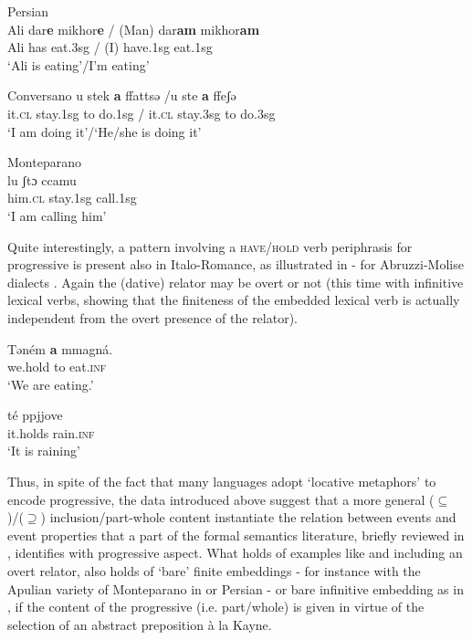\documentclass[output=paper,modfonts,nonflat,newtxmath,colorlinks,citecolor=brown]{langsci/langscibook}
\begin{document}
\ea Persian\\%
    \label{ex:franco:15}
    \gll Ali dar\textbf{e} mikhor\textbf{e} / (Man) dar\textbf{am} mikhor\textbf{am} \\
        Ali has eat.3sg / (I) have.1sg eat.1sg\\
    \glt ‘Ali is eating’/I’m eating’
    \z


\ea Conversano %
    \label{ex:franco:16}
    \gll u stek   \textbf{a}   ffattsə /u   ste   \textbf{a}  ffeʃə\\
        it.\textsc{cl}   stay.1sg to   do.1sg / it.\textsc{cl}   stay.3sg   to do.3sg\\
    \glt ‘I am doing it’/‘He/she is doing it’
    \z
    
\ea Monteparano\\ %
    \label{ex:franco:17}
    \gll lu   ʃtɔ   ccamu  \\
        him.\textsc{cl} stay.1sg   call.1sg \\
    \glt 
‘I am calling him’
    \z

   

Quite interestingly, a pattern involving a \textsc{have/hold} verb periphrasis for progressive is present also in Italo-Romance, as illustrated in - for Abruzzi-Molise dialects \citep[555]{Cinque2017}. Again the (dative) relator may be overt  or not  (this time with infinitive lexical verbs, showing that the finiteness of the embedded lexical verb is actually independent from the overt presence of the relator). 

\ea%
    \label{ex:franco:18}
    \gll Təném \textbf{a} mmagná.\\
        we.hold to eat.\textsc{inf}\\
    \glt ‘We are eating.’  \citep[133]{Rohlfs1969}

    \z

\ea%
    \label{ex:franco:19}
    \gll té ppjjove    \\
        it.holds rain.\textsc{inf}\\
    \glt ‘It is raining’ \citep[266]{Ledgeway2016}
    \z

Thus, in spite of the fact that many languages adopt ‘locative metaphors’ to encode progressive, the data introduced above suggest that a more general (${\subseteq}$)/(${\supseteq}$) inclusion/part-whole content instantiate the relation between events and event properties that a part of the formal semantics literature, briefly reviewed in , identifies with progressive aspect.\textsuperscript{} What holds of examples like  and  including an overt relator, also holds of ‘bare’ finite embeddings - for instance with the Apulian variety of Monteparano in  or Persian  - or bare infinitive embedding as in , if the content of the progressive (i.e. part/whole) is given in virtue of the selection of an abstract preposition {à la} Kayne. 
\end{document}
